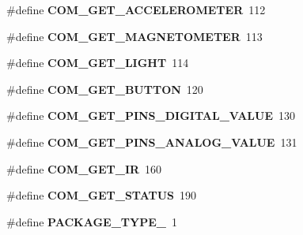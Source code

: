 \begin{DoxyCompactItemize}
\item 
\hypertarget{group___engduino_protocol_ga5c4d56c592188f76f959e3e7b13e95dd}{}\#define {\bfseries C\+O\+M\+\_\+\+G\+E\+T\+\_\+\+A\+C\+C\+E\+L\+E\+R\+O\+M\+E\+T\+E\+R}~112\label{group___engduino_protocol_ga5c4d56c592188f76f959e3e7b13e95dd}

\item 
\hypertarget{group___engduino_protocol_ga3de2e3d999239e70733834e1581a08d8}{}\#define {\bfseries C\+O\+M\+\_\+\+G\+E\+T\+\_\+\+M\+A\+G\+N\+E\+T\+O\+M\+E\+T\+E\+R}~113\label{group___engduino_protocol_ga3de2e3d999239e70733834e1581a08d8}

\item 
\hypertarget{group___engduino_protocol_ga478b77772ea8d56620437a726b1c0721}{}\#define {\bfseries C\+O\+M\+\_\+\+G\+E\+T\+\_\+\+L\+I\+G\+H\+T}~114\label{group___engduino_protocol_ga478b77772ea8d56620437a726b1c0721}

\item 
\hypertarget{group___engduino_protocol_ga9c2381513cc4952108d57cad8a900ef3}{}\#define {\bfseries C\+O\+M\+\_\+\+G\+E\+T\+\_\+\+B\+U\+T\+T\+O\+N}~120\label{group___engduino_protocol_ga9c2381513cc4952108d57cad8a900ef3}

\item 
\hypertarget{group___engduino_protocol_ga29a4a6db2998e1430c9ff54cdfaafe83}{}\#define {\bfseries C\+O\+M\+\_\+\+G\+E\+T\+\_\+\+P\+I\+N\+S\+\_\+\+D\+I\+G\+I\+T\+A\+L\+\_\+\+V\+A\+L\+U\+E}~130\label{group___engduino_protocol_ga29a4a6db2998e1430c9ff54cdfaafe83}

\item 
\hypertarget{group___engduino_protocol_gad433e1c8687f0c10225fc5937a8e5509}{}\#define {\bfseries C\+O\+M\+\_\+\+G\+E\+T\+\_\+\+P\+I\+N\+S\+\_\+\+A\+N\+A\+L\+O\+G\+\_\+\+V\+A\+L\+U\+E}~131\label{group___engduino_protocol_gad433e1c8687f0c10225fc5937a8e5509}

\item 
\hypertarget{group___engduino_protocol_ga745cae6ed5beb19a094c7eb57d25748d}{}\#define {\bfseries C\+O\+M\+\_\+\+G\+E\+T\+\_\+\+I\+R}~160\label{group___engduino_protocol_ga745cae6ed5beb19a094c7eb57d25748d}

\item 
\hypertarget{group___engduino_protocol_ga9842a689fbf38c7211743ebb820b185c}{}\#define {\bfseries C\+O\+M\+\_\+\+G\+E\+T\+\_\+\+S\+T\+A\+T\+U\+S}~190\label{group___engduino_protocol_ga9842a689fbf38c7211743ebb820b185c}

\item 
\hypertarget{group___engduino_protocol_ga0c36736eb8295a8e68fe9fadcdf05a34}{}\#define {\bfseries P\+A\+C\+K\+A\+G\+E\+\_\+\+T\+Y\+P\+E\+\_}~1\label{group___engduino_protocol_ga0c36736eb8295a8e68fe9fadcdf05a34}


\end{DoxyCompactItemize}
